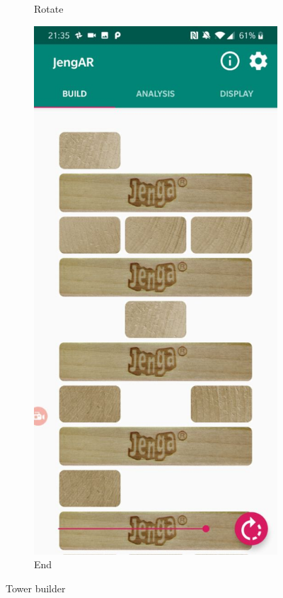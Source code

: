 \begin{figure}[ht]
\begin{subfigure}{0.23\textwidth}
\caption{Rotate} \label{fig:buildrotate}
\end{subfigure}
\hspace*{\fill}
\begin{subfigure}{0.22\textwidth}
\includegraphics[width=\linewidth]{images/implementation/build-end}
\caption{End} \label{fig:buildend}
\end{subfigure}
\hspace*{\fill}
\caption{Tower builder}
\label{fig:towerbuilder}
\end{figure}

